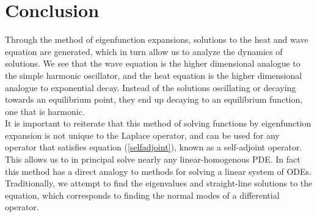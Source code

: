 \documentclass{article}
\begin{document}
\section{Conclusion}
Through the method of eigenfunction expansions, solutions to the heat and wave equation are generated, which in turn allow us to analyze the dynamics of solutions. We see that the wave equation is the higher dimensional analogue to the simple harmonic oscillator, and the heat equation is the higher dimensional analogue to exponential decay. Instead of the solutions oscillating or decaying towards an equilibrium point, they end up decaying to an equilibrium function, one that is harmonic.\\
It is important to reiterate that this method of solving functions by eigenfunction expansion is not unique to the Laplace operator, and can be used for any operator that satisfies equation (\ref{selfadjoint}), known as a self-adjoint operator. This allows us to in principal solve nearly any linear-homogenous PDE. In fact this method has a direct analogy to methods for solving a linear system of ODEs. Traditionally, we attempt to find the eigenvalues and straight-line solutions to the equation, which corresponds to finding the normal modes of a differential operator.
\newpage
\end{document}
